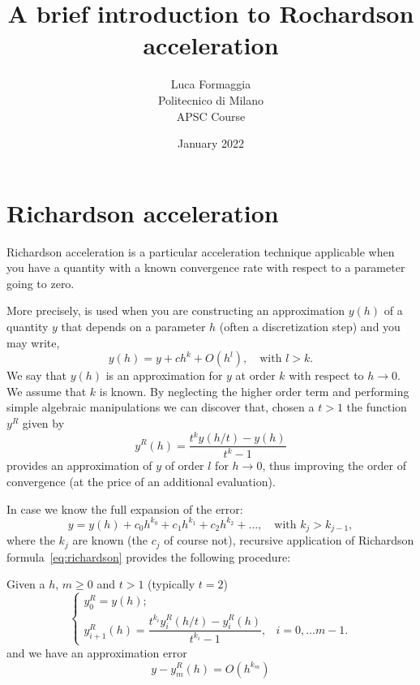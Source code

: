 \documentclass[10pt,a4paper,twoside]{article}
\title{A brief introduction to Rochardson acceleration}
\author{Luca Formaggia\\Politecnico di Milano\\ APSC Course}
\date{January 2022}
\begin{document}
\maketitle
    \section{Richardson acceleration}

    Richardson acceleration is a particular acceleration technique
    applicable when you have a quantity with a known convergence rate
    with respect to a parameter going to zero.
    
    More precisely, is used when you are constructing an approximation
    $y(h)$ of a quantity $y$ that depends on a parameter $h$
    (often a discretization step) and you may write, 
    \begin{equation}
    y(h) = y + ch^k +O(h^{l}),\quad \text{with } l>k.
    \end{equation} 
    We say that $y(h)$ is an approximation for $y$ at order $k$ with respect to $h\to 0$. We assume that $k$ is known. By neglecting the higher order term and performing simple algebraic manipulations
    we can discover that, chosen a $t>1$  the function $y^R$ given by
    \begin{equation}\label{eq:richardson}
    y^R(h)=\frac{t^ky(h/t)-y(h)}{t^k-1}
    \end{equation} 
    provides an approximation of $y$ of order $l$ for $h\to 0$, thus improving the order of convergence (at the price of an additional evaluation).
    
    In case we know the full expansion of the error:
      \begin{equation}\label{eq:expansion}
   y = y(h) + c_0h^{k_0} + c_1h^{k_1} +c_2h^{k_2} + \ldots,\quad \text{with } k_j>k_{j-1},
   \end{equation} 
   where the $k_j$ are known (the $c_j$ of course not), recursive application of Richardson formula~\eqref{eq:richardson} provides the following procedure:

   Given a $h$, $m\ge 0$ and $t>1$ (typically $t=2$)
    \begin{equation}\label{eq:Richbase}
    \begin{cases}
    y^R_0=y(h);\\
    y^R_{i+1}(h)=\dfrac{t^{k_i}y^R_i(h/t)-y^R_i(h)}{t^{k_i}-1},& i=0,\ldots m-1.
    \end{cases}
  \end{equation}
    and we have an approximation error
    \begin{equation}
    y-y^R_m(h)=O(h^{k_m})
    \end{equation}
  
\end{document}
